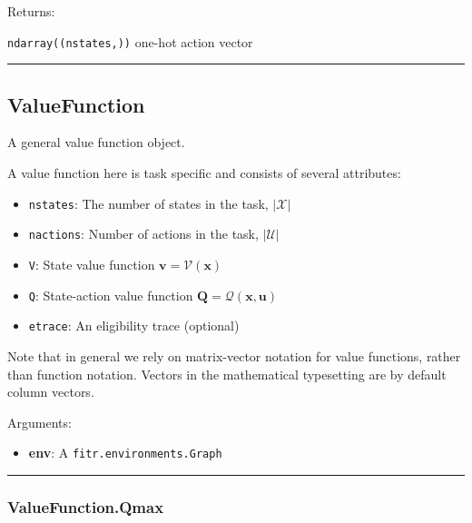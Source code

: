 Returns:

\texttt{ndarray((nstates,))} one-hot action vector

\begin{center}\rule{0.5\linewidth}{\linethickness}\end{center}

\subsection{ValueFunction}\label{valuefunction}

\begin{Shaded}
\begin{Highlighting}[]
\end{Highlighting}
\end{Shaded}

A general value function object.

A value function here is task specific and consists of several
attributes:

\begin{itemize}
\tightlist
\item
  \texttt{nstates}: The number of states in the task, \(|\mathcal X|\)
\item
  \texttt{nactions}: Number of actions in the task, \(|\mathcal U|\)
\item
  \texttt{V}: State value function \(\mathbf v = \mathcal V(\mathbf x)\)
\item
  \texttt{Q}: State-action value function
  \(\mathbf Q = \mathcal Q(\mathbf x, \mathbf u)\)
\item
  \texttt{etrace}: An eligibility trace (optional)
\end{itemize}

Note that in general we rely on matrix-vector notation for value
functions, rather than function notation. Vectors in the mathematical
typesetting are by default column vectors.

Arguments:

\begin{itemize}
\tightlist
\item
  \textbf{env}: A \texttt{fitr.environments.Graph}
\end{itemize}

\begin{center}\rule{0.5\linewidth}{\linethickness}\end{center}

\subsubsection{ValueFunction.Qmax}\label{valuefunction.qmax}

